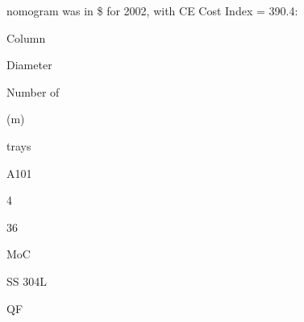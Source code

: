 \documentclass[a4paper,portrait,12pt]{article}
\begin{document}
\begin{flushleft}
nomogram was in \$ for 2002, with CE Cost Index = 390.4:
\end{flushleft}





\begin{flushleft}
Column
\end{flushleft}





\begin{flushleft}
Diameter
\end{flushleft}





\begin{flushleft}
Number of
\end{flushleft}





\begin{flushleft}
(m)
\end{flushleft}





\begin{flushleft}
trays
\end{flushleft}





\begin{flushleft}
A101
\end{flushleft}





4





36





\begin{flushleft}
MoC
\end{flushleft}





\begin{flushleft}
SS 304L
\end{flushleft}





\begin{flushleft}
QF
\end{flushleft}
\end{document}
